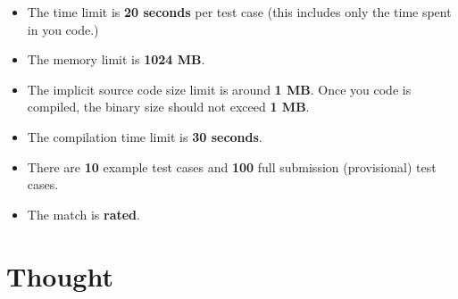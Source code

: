\documentclass[hyperref,UTF8]{ctexart}
\theoremstyle{definition}
\theoremstyle{remark}
\numberwithin{equation}{subsection}
\newcommand{\Emph}{\textbf}
\begin{document}
	\begin{itemize}
	
		\item The time limit is \Emph{20 seconds} per test case (this includes only the time spent in you code.)
		
		\item The memory limit is \Emph{1024 MB}.
		
		\item The implicit source code size limit is around \Emph{1 MB}.
		Once you code is compiled, the binary size should not exceed \Emph{1 MB}.
		
		\item The compilation time limit is \Emph{30 seconds}.
		
		\item There are \Emph{10} example test cases and \Emph{100} full submission (provisional) test cases.

		\item The match is \Emph{rated}.
		
	\end{itemize}
	
\section{Thought}
\label{sec:thought}
	
\end{document}
